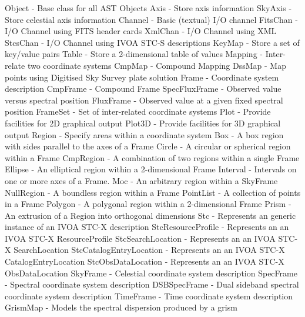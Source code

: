 \documentclass[twoside,11pt]{starlink}
\begin{document}
\small
\begin{terminalv}
Object             - Base class for all AST Objects
   Axis            - Store axis information
      SkyAxis      - Store celestial axis information
   Channel         - Basic (textual) I/O channel
      FitsChan     - I/O Channel using FITS header cards
      XmlChan      - I/O Channel using XML
      StcsChan     - I/O Channel using IVOA STC-S descriptions
   KeyMap          - Store a set of key/value pairs
      Table        - Store a 2-dimensional table of values
   Mapping         - Inter-relate two coordinate systems
      CmpMap       - Compound Mapping
      DssMap       - Map points using Digitised Sky Survey plate solution
      Frame        - Coordinate system description
         CmpFrame  - Compound Frame
            SpecFluxFrame - Observed value versus spectral position
         FluxFrame - Observed value at a given fixed spectral position
         FrameSet  - Set of inter-related coordinate systems
            Plot   - Provide facilities for 2D graphical output
               Plot3D - Provide facilities for 3D graphical output
         Region    - Specify areas within a coordinate system
            Box    - A box region with sides parallel to the axes of a Frame
            Circle - A circular or spherical region within a Frame
            CmpRegion  - A combination of two regions within a single Frame
            Ellipse    - An elliptical region within a 2-dimensional Frame
            Interval   - Intervals on one or more axes of a Frame.
            Moc        - An arbitrary region within a SkyFrame
            NullRegion - A boundless region within a Frame
            PointList  - A collection of points in a Frame
            Polygon    - A polygonal region within a 2-dimensional Frame
            Prism  - An extrusion of a Region into orthogonal dimensions
            Stc    - Represents an generic instance of an IVOA STC-X description
               StcResourceProfile - Represents an an IVOA STC-X ResourceProfile
               StcSearchLocation  - Represents an an IVOA STC-X SearchLocation
               StcCatalogEntryLocation - Represents an an IVOA STC-X CatalogEntryLocation
               StcObsDataLocation - Represents an an IVOA STC-X ObsDataLocation
         SkyFrame  - Celestial coordinate system description
         SpecFrame - Spectral coordinate system description
            DSBSpecFrame - Dual sideband spectral coordinate system description
         TimeFrame - Time coordinate system description
      GrismMap     - Models the spectral dispersion produced by a grism

\end{terminalv}
\end{document}

